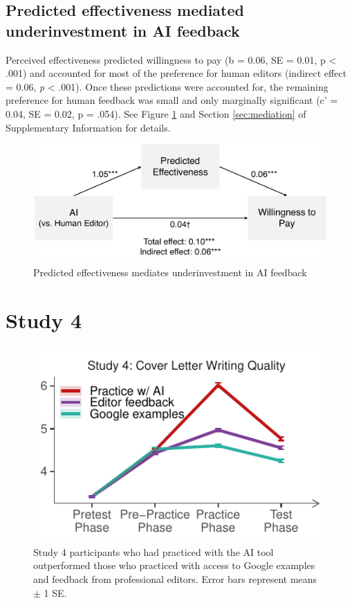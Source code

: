 \documentclass[11pt]{report}
\begin{document}
\begin{mainf}
\subsection*{Predicted effectiveness mediated underinvestment in AI feedback}

Perceived effectiveness predicted willingness to pay (b = 0.06, SE = 0.01, p < .001) and accounted for most of the preference for human editors (indirect effect = 0.06, \textit{p} < .001). Once these predictions were accounted for, the remaining preference for human feedback was small and only marginally significant (c' = 0.04, SE = 0.02, p = .054). See Figure \ref{fig:mediation1} and Section \ref{sec:mediation} of Supplementary Information for details.

\begin{figure}
    \centering
    \includegraphics[width=\linewidth]{mediation.pdf}
    \caption{Predicted effectiveness mediates underinvestment in AI feedback}
    \label{fig:mediation1}
\end{figure}

\section*{Study 4}

\begin{figure}[tb]
    \centering
    \includegraphics[width=1\linewidth]{s5.pdf}
    \caption{Study 4 participants who had practiced with the AI tool outperformed those who practiced with access to Google examples and feedback from professional editors.
    Error bars represent means $\pm$ 1 SE.}
    \label{fig:s5}
\end{figure}


\end{mainf}
\end{document}
